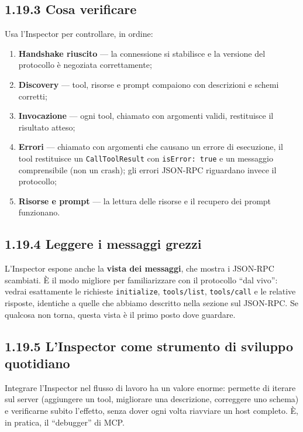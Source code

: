 \documentclass[
  italian,
  10pt,
]{book}
\providecommand{\tightlist}{%
  \setlength{\itemsep}{0pt}\setlength{\parskip}{0pt}}
\begin{document}
\subsection{1.19.3 Cosa verificare}\label{cosa-verificare}

Usa l'Inspector per controllare, in ordine:

\begin{enumerate}
\def\labelenumi{\arabic{enumi}.}
\tightlist
\item
  \textbf{Handshake riuscito} --- la connessione si stabilisce e la
  versione del protocollo è negoziata correttamente;
\item
  \textbf{Discovery} --- tool, risorse e prompt compaiono con
  descrizioni e schemi corretti;
\item
  \textbf{Invocazione} --- ogni tool, chiamato con argomenti validi,
  restituisce il risultato atteso;
\item
  \textbf{Errori} --- chiamato con argomenti che causano un errore di
  esecuzione, il tool restituisce un \texttt{CallToolResult} con
  \texttt{isError:\ true} e un messaggio comprensibile (non un crash);
  gli errori JSON-RPC riguardano invece il protocollo;
\item
  \textbf{Risorse e prompt} --- la lettura delle risorse e il recupero
  dei prompt funzionano.
\end{enumerate}

\subsection{1.19.4 Leggere i messaggi
grezzi}\label{leggere-i-messaggi-grezzi}

L'Inspector espone anche la \textbf{vista dei messaggi}, che mostra i
JSON-RPC scambiati. È il modo migliore per familiarizzare con il
protocollo ``dal vivo'': vedrai esattamente le richieste
\texttt{initialize}, \texttt{tools/list}, \texttt{tools/call} e le
relative risposte, identiche a quelle che abbiamo descritto nella
sezione sul JSON-RPC. Se qualcosa non torna, questa vista è il primo
posto dove guardare.

\subsection{1.19.5 L'Inspector come strumento di sviluppo
quotidiano}\label{linspector-come-strumento-di-sviluppo-quotidiano}

Integrare l'Inspector nel flusso di lavoro ha un valore enorme: permette
di iterare sul server (aggiungere un tool, migliorare una descrizione,
correggere uno schema) e verificarne subito l'effetto, senza dover ogni
volta riavviare un host completo. È, in pratica, il ``debugger'' di MCP.
\end{document}
